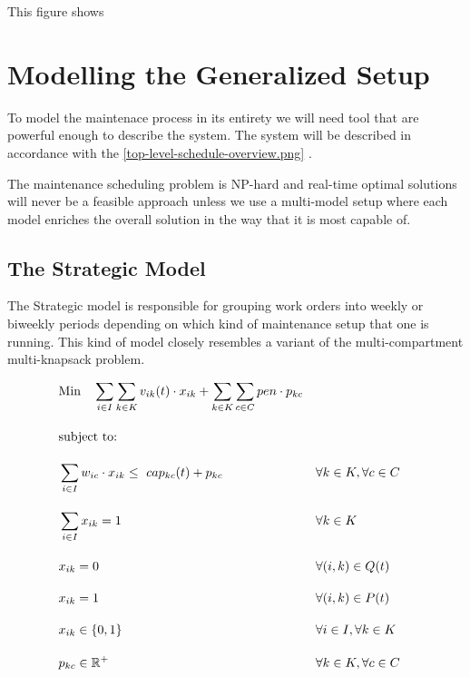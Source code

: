 This figure shows 



\chapter{Modelling the Generalized Setup}
To model the maintenace process in its entirety we will need tool that are powerful enough to describe the system. The system will be described in accordance 
with the \ref{top-level-schedule-overview.png} \cite{palmer_maintenance_2019}.

The maintenance scheduling problem is NP-hard and real-time optimal solutions will never be a feasible approach unless we use a multi-model setup where each model enriches the 
overall solution in the way that it is most capable of. 



\section{The Strategic Model}
The Strategic model is responsible for grouping work orders into weekly or biweekly periods depending on which kind of maintenance setup that one is running.
This kind of model closely resembles a variant of the multi-compartment multi-knapsack problem.


\begin{align}
	& \text{Min} \quad \sum_{i \in I} \sum_{k \in K} v_{ik}(t) \cdot x_{ik} + \sum_{k \in K} \sum_{c \in C} pen \cdot p_{kc}   \label{eqn:objective_function_strategic} \\[1em]
    & \text{subject to:} \notag                                                                                                    \\[1em]
	& \sum_{i \in I} w_{ic} \cdot x_{ik} \leq \ cap_{kc}(t) + p_{kc}&& \forall k \in K, \forall c \in C   \label{eqn:capacity_constraint}          \\[1em]
	& \sum_{i \in I} x_{ik} = 1                                 && \forall k \in K                    \label{eqn:single_workorder_constraint}  \\[1em]
	& x_{ik} = 0                                                  && \forall (i, k) \in Q(t)            \label{eqn:exclusion_constraint}         \\[1em]
	& x_{ik} = 1                                                  && \forall (i, k) \in P(t)            \label{eqn:inclusion_constraint}         \\[1em]
	& x_{ik} \in \{0, 1\}                                         && \forall i \in I, \forall k \in K   \label{eqn:x_integrality_constraint}     \\[1em] 
	& p_{kc} \in \mathbb{R}^{+}                                   && \forall k \in K, \forall c \in C   \label{eqn:p_non_negativity_constraint}  \\[1em]
\end{align}

